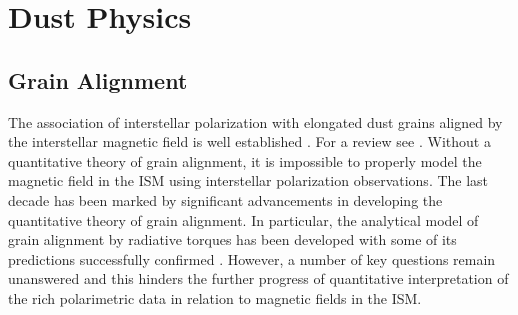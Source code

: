 \documentclass[PICOReport.tex]{subfiles}
\begin{document}

\section{Dust Physics}

\subsection{Grain Alignment}
The association of interstellar polarization with elongated dust grains aligned by the interstellar magnetic field is well established \citep{Hall1949,Hiltner1949, Purcell1979,Spitzer1979}. For a review see \cite{Andersson2015}. Without a quantitative theory of grain alignment, it is impossible to properly model the magnetic field in the ISM using interstellar polarization observations. The last decade has been marked by significant advancements in developing the quantitative theory of grain alignment. In particular, the analytical model of grain alignment by radiative torques \citep{Lazarian2007a} has been developed with some of its predictions successfully confirmed \citep{Andersson2007,Andersson2010}. However, a number of key questions remain unanswered and this hinders the further progress of quantitative interpretation of the rich polarimetric data in relation to magnetic fields in the ISM. 
\end{document}
